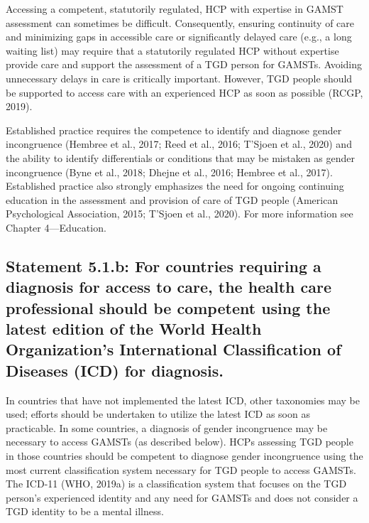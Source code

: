 \documentclass[
]{book}
\begin{document}
Accessing a competent, statutorily regulated,
HCP with expertise in GAMST assessment can
sometimes be difficult. Consequently, ensuring
continuity of care and minimizing gaps in accessible care or significantly delayed care (e.g., a
long waiting list) may require that a statutorily
regulated HCP without expertise provide care and
support the assessment of a TGD person for
GAMSTs. Avoiding unnecessary delays in care is
critically important. However, TGD people should
be supported to access care with an experienced
HCP as soon as possible (RCGP, 2019).

Established practice requires the competence to
identify and diagnose gender incongruence
(Hembree et al., 2017; Reed et al., 2016; T'Sjoen
et al., 2020) and the ability to identify differentials
or conditions that may be mistaken as gender
incongruence (Byne et al., 2018; Dhejne et al.,
2016; Hembree et al., 2017). Established practice
also strongly emphasizes the need for ongoing continuing education in the assessment and provision
of care of TGD people (American Psychological
Association, 2015; T'Sjoen et al., 2020). For more
information see Chapter 4---Education.

\hypertarget{statement-5.1.b-for-countries-requiring-a-diagnosis-for-access-to-care-the-health-care-professional-should-be-competent-using-the-latest-edition-of-the-world-health-organizations-international-classification-of-diseases-icd-for-diagnosis.}{%
\subsection*{Statement 5.1.b: For countries requiring a diagnosis for access to care, the health care professional should be competent using the latest edition of the World Health Organization's International Classification of Diseases (ICD) for diagnosis.}\label{statement-5.1.b-for-countries-requiring-a-diagnosis-for-access-to-care-the-health-care-professional-should-be-competent-using-the-latest-edition-of-the-world-health-organizations-international-classification-of-diseases-icd-for-diagnosis.}}

In countries that
have not implemented the latest ICD, other taxonomies may be used; efforts should be undertaken to utilize the latest ICD as soon as practicable.
In some countries, a diagnosis of gender incongruence may be necessary to access GAMSTs (as
described below). HCPs assessing TGD people in
those countries should be competent to diagnose
gender incongruence using the most current classification system necessary for TGD people to
access GAMSTs. The ICD-11 (WHO, 2019a) is a
classification system that focuses on the TGD
person's experienced identity and any need for
GAMSTs and does not consider a TGD identity
to be a mental illness.
\end{document}
